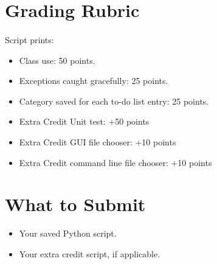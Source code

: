 \documentclass[letter,10pt]{article}
\begin{document}
    \section*{Grading Rubric}
    \paragraph{}Script prints:
    \begin{itemize}
        \item Class use: 50 points.
        \item Exceptions caught gracefully: 25 points.
        \item Category saved for each to-do list entry: 25 points.
        \item Extra Credit Unit test: +50 points
        \item Extra Credit GUI file chooser: +10 points
        \item Extra Credit command line file chooser: +10 points
    \end{itemize}
    
    \section*{What to Submit}
    \begin{itemize}
        \item Your saved Python script.
        \item Your extra credit script, if applicable.
    \end{itemize}
    
\end{document}
